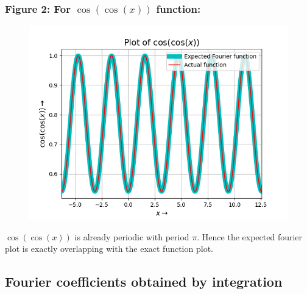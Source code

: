 \documentclass[12pt, a4paper]{article}
\begin{document}
\subsubsection{Figure 2: For $\cos(\cos(x))$ function:}
\vspace*{-0.5cm}
    \begin{figure}[H]
        \centering
        \includegraphics[scale = 0.75]{Figure_2.png}
        \label{fig:sample}
    \end{figure}
\vspace*{-0.5cm}
    \begin{center}
    $\cos(\cos(x))$ is already periodic with period $\pi$. Hence the expected fourier plot is exactly overlapping with the exact function plot.
\end{center}

\subsection{Fourier coefficients obtained by integration}
\end{document}
